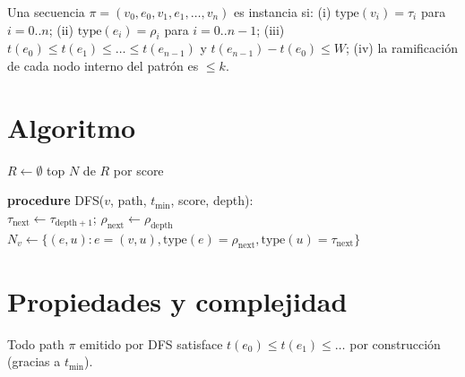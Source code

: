 \begin{definition}
Una secuencia $\pi = (v_0, e_0, v_1, e_1, \dots, v_n)$ es instancia
si: (i) $\text{type}(v_i) = \tau_i$ para $i = 0..n$; (ii)
$\text{type}(e_i) = \rho_i$ para $i = 0..n-1$; (iii)
$t(e_0) \le t(e_1) \le \dots \le t(e_{n-1})$ y
$t(e_{n-1}) - t(e_0) \le W$; (iv) la ramificación de cada nodo
interno del patrón es $\le k$.
\end{definition}

\section{Algoritmo}

\begin{algorithm}[H]
\caption{DFS temporal guiado por score parcial}
\label{alg:paper-dfs}
$R \gets \emptyset$ 
\Return top $N$ de $R$ por score\;

\BlankLine
\textbf{procedure} DFS($v$, path, $t_{\min}$, score, depth):\\
$\tau_{\text{next}} \gets \tau_{\text{depth}+1}$;
$\rho_{\text{next}} \gets \rho_{\text{depth}}$\;
$N_v \gets \{(e, u) : e = (v, u), \text{type}(e) = \rho_{\text{next}}, \text{type}(u) = \tau_{\text{next}}\}$\;
\end{algorithm}

\section{Propiedades y complejidad}

\begin{lemma}
Todo path $\pi$ emitido por DFS satisface
$t(e_0) \le t(e_1) \le \dots$ por construcción
(gracias a $t_{\min}$).
\end{lemma}


